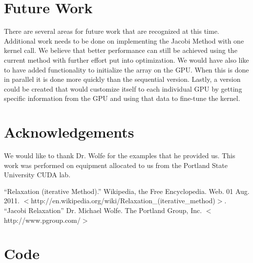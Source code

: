 \documentclass[10pt]{article}
\begin{document}
\begin{multicols}{2}
  \section{Future Work} %
  \label{sec:future_work}
  There are several areas for future work that are recognized at this time.
  Additional work needs to be done on implementing the Jacobi Method with one kernel call.
  We believe that better performance can still be achieved using the current method with further effort put into optimization.
  We would have also like to have added functionality to initialize the array on the GPU.
  When this is done in parallel it is done more quickly than the sequential version.
  Lastly, a version could be created that would customize itself to each individual GPU by getting specific information from the GPU and using that data to fine-tune the kernel.

  \section{Acknowledgements} %
  \label{sec:acknowledgements}
  We would like to thank Dr. Wolfe for the examples that he provided us.
  This work was performed on equipment allocated to us from the Portland State University CUDA lab.

\end{multicols}

\begin{flushleft}
  \begin{thebibliography}{99}
    ``Relaxation (iterative Method).''
      Wikipedia, the Free Encyclopedia. Web. 01 Aug. 2011. $<$http://en.wikipedia.org/wiki/Relaxation\_(iterative\_method)$>$.
    ``Jacobi Relaxation''
      Dr. Michael Wolfe. The Portland Group, Inc. $<$http://www.pgroup.com/$>$
  \end{thebibliography}
\end{flushleft}

\clearpage

\appendix
\section{Code}
\label{sec:code}

\end{document}
